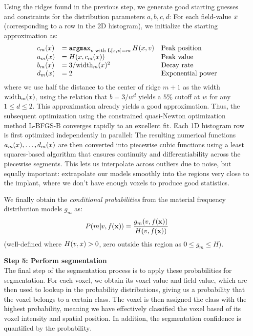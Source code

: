 \documentclass[pdflatex,sn-mathphys]{sn-jnl}%
\theoremstyle{thmstyleone}%
\theoremstyle{thmstyletwo}%
\theoremstyle{thmstylethree}%
\begin{document}
Using the ridges found in the previous step, we generate good starting
guesses and constraints for the distribution parameters
$a,b,c,d$:
For each field-value $x$ (corresponding to a row in the 2D histogram),
we initialize the starting approximation as:
\begin{equation}
  \label{eq:starting-guesses}
  \begin{array}{lll}
    c_m(x) &= \mathop{\mathtt{argmax}}_{v \text{ with }\mathrm{L}[x,v] = m} H(x,v)  & \text{Peak position}  \\
    a_m(x) &= H(x,c_m(x)) & \text{Peak value}\\
    b_m(x) &= 3/\mathrm{width}_m(x)^2  & \text{Decay rate}\\
    d_m(x) &= 2 & \text{Exponential power}
  \end{array}
\end{equation}
where we use half the distance to the center of ridge $m+1$ as the width
$\mathrm{width_m}(x)$, using the relation that $b = 3/w^d$ yields
a $5\%$ cutoff at $w$ for any $1\le d \le 2$. This approximation
already yields a good approximation. Thus, the subsequent
optimization using the constrained quasi-Newton optimization method L-BFGS-B\cite{BFGS}
converges rapidly to an excellent fit. Each 1D histogram row is first optimized
independently in parallel: The resulting numerical functions
$a_m(x),\ldots,d_m(x)$ are then converted into piecewise cubic
functions using a least squares-based algorithm that ensures continuity
and differentiability across the piecewise segments. This lets us interpolate across
outliers due to noise, but equally important:
extrapolate our models smoothly into the regions very close to the implant, where
we don't have enough voxels to produce good statistics.

We finally obtain the {\it conditional probabilities} from the material frequency distribution
models $g_m$ as:
\begin{equation}
  \label{eq:Pm}
  P\!\left(m\middle\vert v,f(\mathbf{x})\right) = \frac{g_m(v,f(\mathbf{x}))}{H(v,f(\mathbf{x}))}
\end{equation}
(well-defined where $H(v,x) > 0$, zero outside this region as $0\le g_m \le H$).


\vspace{\baselineskip}
\noindent\textbf{Step 5: Perform segmentation} \\
The final step of the segmentation process is to apply these probabilities for segmentation.
For each voxel, we obtain its voxel value and field value, which are then used to lookup in the probability distributions, giving us a probability that the voxel belongs to a certain class.
The voxel is then assigned the class with the highest probability, meaning we have effectively classified the voxel based of its voxel intensity and spatial position. In addition,
the segmentation confidence is quantified by the probability.
\end{document}
